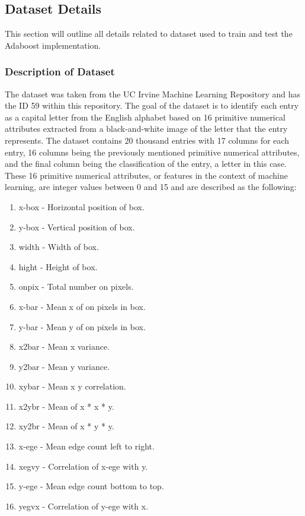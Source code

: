 \documentclass[a4paper]{article}
\begin{document}
\subsection{Dataset Details}
This section will outline all details related to dataset used to train and test the Adaboost implementation. 

\subsubsection{Description of Dataset}
The dataset was taken from the UC Irvine Machine Learning Repository and has the ID 59 within this repository. The goal of the dataset is to identify each entry as a capital letter from the English alphabet based on 16 primitive numerical attributes extracted from a black-and-white image of the letter that the entry represents. The dataset contains 20 thousand entries with 17 columns for each entry, 16 columns being the previously mentioned primitive numerical attributes, and the final column being the classification of the entry, a letter in this case. These 16 primitive numerical attributes, or features in the context of machine learning, are integer values between 0 and 15 and are described as the following:
\begin{enumerate}
    \item x-box - Horizontal position of box.
    \item y-box - Vertical position of box.
    \item width - Width of box.
    \item hight - Height of box.
    \item onpix - Total number on pixels.
    \item x-bar - Mean x of on pixels in box.
    \item y-bar - Mean y of on pixels in box.
    \item x2bar - Mean x variance.
    \item y2bar - Mean y variance.
    \item xybar - Mean x y correlation.
    \item x2ybr - Mean of x * x * y.
    \item xy2br - Mean of x * y * y.
    \item x-ege - Mean edge count left to right.
    \item xegvy - Correlation of x-ege with y.
    \item y-ege - Mean edge count bottom to top.
    \item yegvx - Correlation of y-ege with x.
\end{enumerate}
\end{document}
